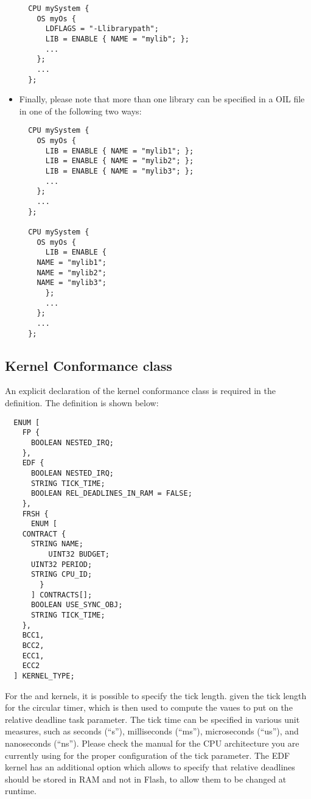 \begin{itemize}
\begin{lstlisting}
  CPU mySystem {
    OS myOs {
      LDFLAGS = "-Llibrarypath";
      LIB = ENABLE { NAME = "mylib"; };
      ...
    };
    ...
  };
\end{lstlisting}

\item
  Finally, please note that more than one library can be specified in
  a OIL file in one of the following two ways:
\begin{lstlisting}
  CPU mySystem {
    OS myOs {
      LIB = ENABLE { NAME = "mylib1"; };
      LIB = ENABLE { NAME = "mylib2"; };
      LIB = ENABLE { NAME = "mylib3"; };
      ...
    };
    ...
  };

  CPU mySystem {
    OS myOs {
      LIB = ENABLE {
	NAME = "mylib1"; 
	NAME = "mylib2"; 
	NAME = "mylib3"; 
      };
      ...
    };
    ...
  };
\end{lstlisting}

\end{itemize}


\subsection{Kernel Conformance class}

An explicit declaration of the kernel conformance class is required in
the  definition. The definition is shown below:

\begin{lstlisting}
  ENUM [
    FP {
      BOOLEAN NESTED_IRQ;
    },
    EDF {
      BOOLEAN NESTED_IRQ;
      STRING TICK_TIME; 
      BOOLEAN REL_DEADLINES_IN_RAM = FALSE;
    },
    FRSH {
      ENUM [
	CONTRACT {
	  STRING NAME;
          UINT32 BUDGET;
	  UINT32 PERIOD;
	  STRING CPU_ID;
        }
      ] CONTRACTS[];
      BOOLEAN USE_SYNC_OBJ;
      STRING TICK_TIME;
    },
    BCC1,
    BCC2,
    ECC1,
    ECC2
  ] KERNEL_TYPE;
\end{lstlisting}

For the  and  kernels, it is possible to
specify the tick length. given the tick length for the circular timer,
which is then used to compute the vaues to put on the relative
deadline task parameter. The tick time can be specified in various
unit measures, such as seconds (``s''), milliseconds (``ms''),
microseconds (``us''), and nanoseconds (``ns''). Please check the
manual for the CPU architecture you are currently using for the proper
configuration of the tick parameter. The EDF kernel has an additional
option which allows to specify that relative deadlines should be
stored in RAM and not in Flash, to allow them to be changed at
runtime.


